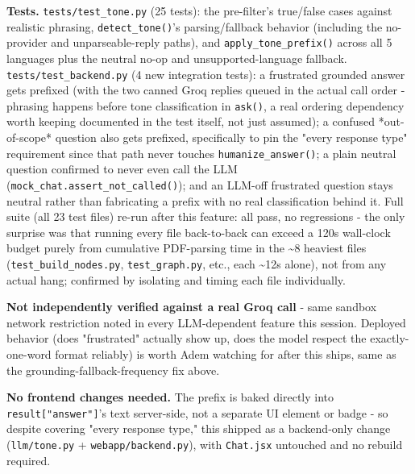 \textbf{Tests.} \texttt{tests/\allowbreak{}test\_\allowbreak{}tone.py} (25 tests): the pre-filter's true/false cases against realistic phrasing, \texttt{detect\_\allowbreak{}tone()}'s parsing/fallback behavior (including the no-provider and unparseable-reply paths), and \texttt{apply\_\allowbreak{}tone\_\allowbreak{}prefix()} across all 5 languages plus the neutral no-op and unsupported-language fallback. \texttt{tests/\allowbreak{}test\_\allowbreak{}backend.py} (4 new integration tests): a frustrated grounded answer gets prefixed (with the two canned Groq replies queued in the actual call order - phrasing happens before tone classification in \texttt{ask()}, a real ordering dependency worth keeping documented in the test itself, not just assumed); a confused *out-of-scope* question also gets prefixed, specifically to pin the "every response type" requirement since that path never touches \texttt{humanize\_\allowbreak{}answer()}; a plain neutral question confirmed to never even call the LLM (\texttt{mock\_\allowbreak{}chat.assert\_\allowbreak{}not\_\allowbreak{}called()}); and an LLM-off frustrated question stays neutral rather than fabricating a prefix with no real classification behind it. Full suite (all 23 test files) re-run after this feature: all pass, no regressions - the only surprise was that running every file back-to-back can exceed a 120s wall-clock budget purely from cumulative PDF-parsing time in the \textasciitilde{}8 heaviest files (\texttt{test\_\allowbreak{}build\_\allowbreak{}nodes.py}, \texttt{test\_\allowbreak{}graph.py}, etc., each \textasciitilde{}12s alone), not from any actual hang; confirmed by isolating and timing each file individually.

\textbf{Not independently verified against a real Groq call} - same sandbox network restriction noted in every LLM-dependent feature this session. Deployed behavior (does "frustrated" actually show up, does the model respect the exactly-one-word format reliably) is worth Adem watching for after this ships, same as the grounding-fallback-frequency fix above.

\textbf{No frontend changes needed.} The prefix is baked directly into \texttt{result["answer"]}'s text server-side, not a separate UI element or badge - so despite covering "every response type," this shipped as a backend-only change (\texttt{llm/\allowbreak{}tone.py} + \texttt{webapp/\allowbreak{}backend.py}), with \texttt{Chat.jsx} untouched and no rebuild required.


